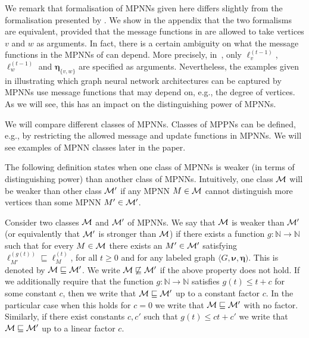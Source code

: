 We remark that formalisation of MPNNs given here differs slightly from the formalisation presented by \cite{GilmerSRVD17}. We show in the appendix that the two formalisms are equivalent, provided that the message functions in \cite{GilmerSRVD17} are allowed to take vertices $v$ and $w$ as arguments. In fact, there is a certain ambiguity on what the message functions in the MPNNs of \cite{GilmerSRVD17} can depend. More precisely, in~\cite{GilmerSRVD17}, only $\pmb{\ell}_v^{(t-1)}$, $\pmb{\ell}_w^{(t-1)}$ and $\pmb{\eta}_{\{v,w\}}$ are specified as arguments. Nevertheless, the examples given in  \cite{GilmerSRVD17} illustrating which graph neural network architectures can be captured by MPNNs use message functions that may depend on, e.g., the degree  of vertices. As we will see, this has an impact on the distinguishing power of MPNNs.

We will compare different classes of MPNNs.  Classes of MPPNs can be defined, e.g., by restricting the allowed message and update functions in MPNNs. We will see  examples of MPNN classes later in the paper. 

The following definition states when one class of MPNNs is weaker (in terms of distinguishing power) than another class of MPNNs. Intuitively, one class $\mathcal{M}$ will be weaker than other class $\mathcal{M}'$ if any MPNN $M\in\mathcal{M}$ cannot distinguish more vertices than some MPNN $M'\in\mathcal{M}'$.

\begin{definition}\label{def:comparing}\normalfont
Consider two classes $\mathcal{M}$ and $\mathcal{M}'$ of MPNNs. We say that $\mathcal{M}$ is weaker than $\mathcal{M}'$ (or equivalently that $\mathcal{M}'$ is stronger than $\mathcal{M}$) if there exists a function $g:\mathbb{N}\to \mathbb{N}$ such that for every $M \in \mathcal{M}$ there exists an $M'\in \mathcal{M}'$ satisfying $\pmb{\ell}_{M'}^{(g(t))}\sqsubseteq \pmb{\ell}_{M}^{(t)}$, for all $t\geq 0$ and for any labeled graph $\langle G,\pmb{\nu},\pmb{\eta})$. This is denoted by $\mathcal{M} \sqsubseteq \mathcal{M}'$.
We write $\mathcal{M} \not \sqsubseteq \mathcal{M}'$ if the above property does not hold. 
If we additionally require that the function $g:\mathbb{N}\to\mathbb{N}$ satisfies 
$g(t)\le t +c$ for some constant $c$, then we write that $\mathcal{M} \sqsubseteq \mathcal{M}'$ up to a constant factor $c$. In the particular case when this holds for $c = 0$ we write that $\mathcal{M} \sqsubseteq \mathcal{M}'$ with no factor. Similarly, if there exist constants $c, c'$ such that $g(t) \le ct + c'$ we write that $\mathcal{M} \sqsubseteq \mathcal{M}'$ up to a linear factor $c$.
\end{definition}

